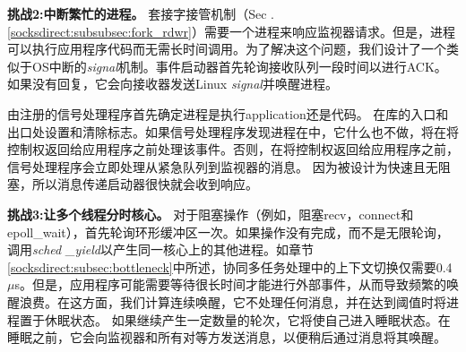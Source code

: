 \textbf {挑战2:中断繁忙的进程。}
套接字接管机制（Sec .~ \ref {socksdirect:subsubsec:fork_rdwr}）需要一个进程来响应监视器请求。但是，进程可以执行应用程序代码而无需长时间调用\libipc {}。为了解决这个问题，我们设计了一个类似于OS中断的\textit {signal}机制。事件启动器首先轮询接收队列一段时间以进行ACK。如果没有回复，它会向接收器发送Linux \textit {signal}并唤醒进程。

由\libipc {}注册的信号处理程序首先确定进程是执行application还是\libipc {}代码。 \libipc {}在库的入口和出口处设置和清除标志。如果信号处理程序发现进程在\libipc 中，它什么也不做，\libipc {}将在将控制权返回给应用程序之前处理该事件。否则，在将控制权返回给应用程序之前，信号处理程序会立即处理从紧急队列到监视器的消息。
因为\libipc {}被设计为快速且无阻塞，所以消息传递启动器很快就会收到响应。

\textbf {挑战3:让多个线程分时核心。}
对于阻塞操作（例如，阻塞recv，connect和epoll\_wait），\libipc {}首先轮询环形缓冲区一次。如果操作没有完成，而不是无限轮询，\libipc {}调用\textit {sched \_yield}以产生同一核心上的其他进程。如章节 \ref {socksdirect:subsec:bottleneck}中所述，协同多任务处理中的上下文切换仅需要0.4~$\mu$s。但是，应用程序可能需要等待很长时间才能进行外部事件，从而导致频繁的唤醒浪费。在这方面，我们计算连续唤醒，它不处理任何消息，并在达到阈值时将进程置于休眠状态。
如果\libipc {}继续产生一定数量的轮次，它将使自己进入睡眠状态。在睡眠之前，它会向监视器和所有对等方发送消息，以便稍后通过消息将其唤醒。




